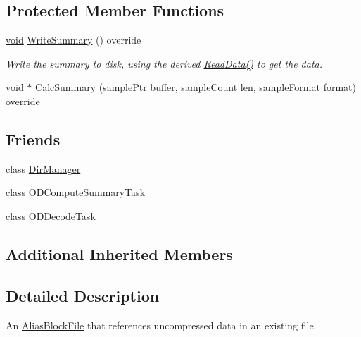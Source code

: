 \subsection*{Protected Member Functions}
\begin{DoxyCompactItemize}
\item 
\hyperlink{sound_8c_ae35f5844602719cf66324f4de2a658b3}{void} \hyperlink{class_o_d_p_c_m_alias_block_file_acb8de98382b5fa4932c431d33adbd8f9}{Write\+Summary} () override
\begin{DoxyCompactList}\small\item\em Write the summary to disk, using the derived \hyperlink{class_o_d_p_c_m_alias_block_file_a52ff6c8c85016d45e39e33eea8956ba7}{Read\+Data()} to get the data. \end{DoxyCompactList}\item 
\hyperlink{sound_8c_ae35f5844602719cf66324f4de2a658b3}{void} $\ast$ \hyperlink{class_o_d_p_c_m_alias_block_file_a12bb8dca9c683e2634a38187c2db2000}{Calc\+Summary} (\hyperlink{include_2audacity_2_types_8h_aaafb46d1caf7c79262fec96b577215fe}{sample\+Ptr} \hyperlink{structbuffer}{buffer}, \hyperlink{include_2audacity_2_types_8h_afa427e1f521ea5ec12d054e8bd4d0f71}{sample\+Count} \hyperlink{lib_2expat_8h_af86d325fecfc8f47b61fbf5a5146f582}{len}, \hyperlink{include_2audacity_2_types_8h_a9938d2e2f6adef23e745cd80ef379792}{sample\+Format} \hyperlink{_export_p_c_m_8cpp_a317afff57d87a89158c2b038d37b2b08}{format}) override
\end{DoxyCompactItemize}
\subsection*{Friends}
\begin{DoxyCompactItemize}
\item 
class \hyperlink{class_o_d_p_c_m_alias_block_file_a0db96e19e318fc03ec706babee75be8f}{Dir\+Manager}
\item 
class \hyperlink{class_o_d_p_c_m_alias_block_file_a24c4db9b12ac4619d1b2a0966f0e756c}{O\+D\+Compute\+Summary\+Task}
\item 
class \hyperlink{class_o_d_p_c_m_alias_block_file_aee4dd21db513d608a0b91918d594fbbe}{O\+D\+Decode\+Task}
\end{DoxyCompactItemize}
\subsection*{Additional Inherited Members}


\subsection{Detailed Description}
An \hyperlink{class_alias_block_file}{Alias\+Block\+File} that references uncompressed data in an existing file. 

